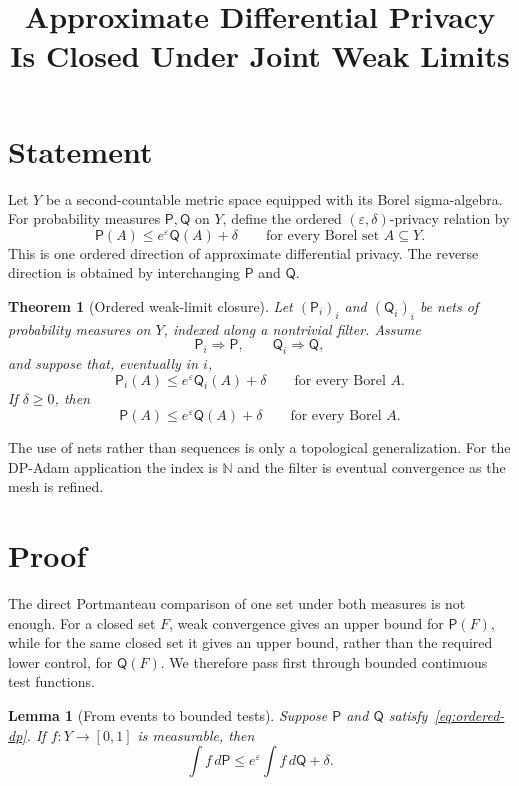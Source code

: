 \documentclass[11pt]{article}
\title{Approximate Differential Privacy Is Closed Under Joint Weak Limits}
\author{}
\date{}
\newtheorem{theorem}{Theorem}
\newtheorem{lemma}{Lemma}
\newcommand{\Pp}{\mathsf P}
\newcommand{\Qq}{\mathsf Q}
\begin{document}
\maketitle

\section{Statement}

Let \(Y\) be a second-countable metric space equipped with its Borel
sigma-algebra.  For probability measures \(\Pp,\Qq\) on \(Y\), define the
ordered \((\varepsilon,\delta)\)-privacy relation by
\begin{equation}
  \Pp(A)
  \leq
  e^\varepsilon \Qq(A)+\delta
  \qquad
  \text{for every Borel set }A\subseteq Y.
  \label{eq:ordered-dp}
\end{equation}
This is one ordered direction of approximate differential privacy.  The
reverse direction is obtained by interchanging \(\Pp\) and \(\Qq\).

\begin{theorem}[Ordered weak-limit closure]
\label{thm:ordered-closure}
Let \((\Pp_i)_i\) and \((\Qq_i)_i\) be nets of probability measures on \(Y\),
indexed along a nontrivial filter.  Assume
\[
  \Pp_i \Rightarrow \Pp,
  \qquad
  \Qq_i \Rightarrow \Qq,
\]
and suppose that, eventually in \(i\),
\[
  \Pp_i(A)\leq e^\varepsilon\Qq_i(A)+\delta
  \qquad
  \text{for every Borel }A.
\]
If \(\delta\geq0\), then
\[
  \Pp(A)\leq e^\varepsilon\Qq(A)+\delta
  \qquad
  \text{for every Borel }A.
\]
\end{theorem}

The use of nets rather than sequences is only a topological generalization.
For the DP-Adam application the index is \(\mathbb N\) and the filter is
eventual convergence as the mesh is refined.

\section{Proof}

The direct Portmanteau comparison of one set under both measures is not
enough.  For a closed set \(F\), weak convergence gives an upper bound for
\(\Pp(F)\), while for the same closed set it gives an upper bound, rather than
the required lower control, for \(\Qq(F)\).  We therefore pass first through
bounded continuous test functions.

\begin{lemma}[From events to bounded tests]
\label{lem:event-to-test}
Suppose \(\Pp\) and \(\Qq\) satisfy~\eqref{eq:ordered-dp}.  If
\(f:Y\to[0,1]\) is measurable, then
\[
  \int f\,d\Pp
  \leq
  e^\varepsilon\int f\,d\Qq+\delta.
\]
\end{lemma}
\end{document}
